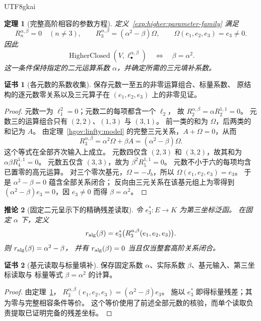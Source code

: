 \documentclass[12pt,a4paper,openany,notitlepage]{report}
\theoremstyle{plain}
\newtheorem{theorem}{定理}[chapter]
\newtheorem{corollary}[theorem]{推论}
\theoremstyle{definition}
\newtheorem*{certificate}{证书}
\theoremstyle{remark}
\def\mathcal#1{#1}\def\mathsf#1{#1}\def\mathbb#1{#1}%
\begin{document}
\begin{CJK*}{UTF8}{gkai}
\begin{theorem}[完整高阶相容的参数方程]
\label{exp:higher:scaled-closure}
定义~\ref{exp:higher:parameter-family} 满足
\[
 \mathcal R_n^{\alpha,\beta}=0\quad(n\ne3),
 \qquad
 \mathcal R_3^{\alpha,\beta}=(\alpha^2-\beta)\Omega,
 \qquad
 \Omega(e_1,e_2,e_3)=e_3\ne0.
\]
因此
\[
 \operatorname{HigherClosed}(V,\ell_\bullet^{\alpha,\beta})
 \quad\Longleftrightarrow\quad \beta=\alpha^2.
\]
这一条件保持指定的二元运算系数 $\alpha$，并确定所需的三元填补系数。
\end{theorem}
\begin{certificate}[各元数的系数收集]
保存元数一至五的非零运算组合、标量系数、
原结构的逐元数零关系以及三元算子在 $(e_1,e_2,e_3)$ 上的非零见证。
\end{certificate}
\begin{proof}
元数一为 $\ell_1^2=0$；元数二的每项都含一个 $\ell_2$，
故 $\mathcal R_2^{\alpha,\beta}=\alpha\mathcal R_2^{1,1}=0$。
元数三的运算组合只有 $(2,2)$、$(1,3)$ 与 $(3,1)$。
前一类的和为 $\Omega$，后两类的和记为 $A$。
由定理~\ref{hgov:linfty:model} 的完整三元关系，$A+\Omega=0$，从而
\[
 \mathcal R_3^{\alpha,\beta}
 =\alpha^2\Omega+\beta A=(\alpha^2-\beta)\Omega.
\]
这个等式在全部齐次输入上成立。
元数四仅含 $(2,3)$ 和 $(3,2)$，故其和为
$\alpha\beta\mathcal R_4^{1,1}=0$。
元数五仅含 $(3,3)$，故为 $\beta^2\mathcal R_5^{1,1}=0$。
元数不小于六的每项均含已置零的高元运算。
对三个零次基元，$\Omega=-J_b$，所以
$\Omega(e_1,e_2,e_3)=e_3$。
于是 $\alpha^2-\beta=0$ 蕴含全部关系闭合；
反向由三元关系在该基元组上为零得到
$(\alpha^2-\beta)e_3=0$，因 $e_3\ne0$ 而得 $\beta=\alpha^2$。
\end{proof}

\begin{corollary}[固定二元呈示下的精确残差读取]
\label{exp:higher:residual-readout}
令 $e_3^*:E\to\mathbb K$ 为第三坐标泛函。
在固定 $\alpha$ 下，定义
\[
 r_{\rm alg}(\beta)
 =e_3^*\bigl(\mathcal R_3^{\alpha,\beta}(e_1,e_2,e_3)\bigr).
\]
则 $r_{\rm alg}(\beta)=\alpha^2-\beta$，
并有 $r_{\rm alg}(\beta)=0$ 当且仅当整套高阶关系闭合。
\end{corollary}
\begin{certificate}[基元读取与标量填补]
保存固定系数 $\alpha$、实际系数 $\beta$、基元输入、第三坐标读取与
标量等式 $\beta=\alpha^2$ 的计算。
\end{certificate}
\begin{proof}
由定理~\ref{exp:higher:scaled-closure}，
$\mathcal R_3^{\alpha,\beta}(e_1,e_2,e_3)=(\alpha^2-\beta)e_3$。
施以 $e_3^*$ 即得标量残差；其为零与完整相容条件等价。
这个等价使用了前述全部元数的核验，而单个读取负责提取已证明完备的残差坐标。
\end{proof}



\end{CJK*}
\end{document}
